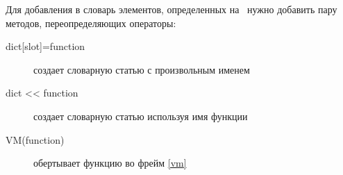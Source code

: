 \label{fdict}


\noindent
Для добавления в словарь элементов, определенных на \py\ нужно добавить пару
методов, переопределяющих операторы:
\begin{description}
\item[{dict[slot]=function}] создает словарную статью с произвольным именем
\item[dict << function] создает словарную статью используя имя функции
\item[VM(function)] обертывает функцию во фрейм \ref{vm}
\end{description}

\medskip
{}
